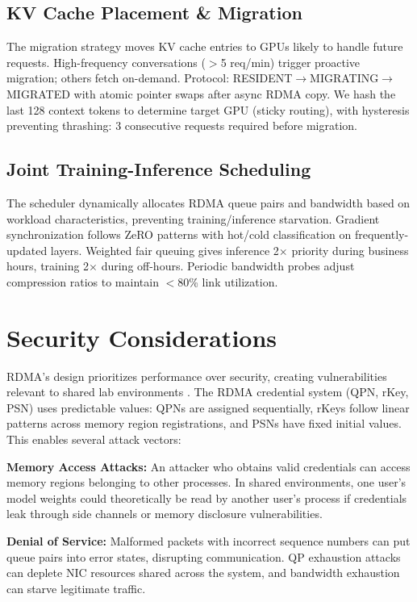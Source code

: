 \documentclass[10pt,letterpaper]{article}
\begin{document}
\subsection{KV Cache Placement \& Migration}
The migration strategy moves KV cache entries to GPUs likely to handle future requests. High-frequency conversations ($>$5 req/min) trigger proactive migration; others fetch on-demand. Protocol: RESIDENT$\rightarrow$MIGRATING$\rightarrow$MIGRATED with atomic pointer swaps after async RDMA copy. We hash the last 128 context tokens to determine target GPU (sticky routing), with hysteresis preventing thrashing: 3 consecutive requests required before migration.

\subsection{Joint Training-Inference Scheduling}
The scheduler dynamically allocates RDMA queue pairs and bandwidth based on workload characteristics, preventing training/inference starvation. Gradient synchronization follows ZeRO patterns with hot/cold classification on frequently-updated layers. Weighted fair queuing gives inference 2$\times$ priority during business hours, training 2$\times$ during off-hours. Periodic bandwidth probes adjust compression ratios to maintain $<$80\% link utilization.

\section{Security Considerations}

RDMA's design prioritizes performance over security, creating vulnerabilities relevant to shared lab environments \cite{bedrock, redmark}. The RDMA credential system (QPN, rKey, PSN) uses predictable values: QPNs are assigned sequentially, rKeys follow linear patterns across memory region registrations, and PSNs have fixed initial values. This enables several attack vectors:

\textbf{Memory Access Attacks:} An attacker who obtains valid credentials can access memory regions belonging to other processes. In shared environments, one user's model weights could theoretically be read by another user's process if credentials leak through side channels or memory disclosure vulnerabilities.

\textbf{Denial of Service:} Malformed packets with incorrect sequence numbers can put queue pairs into error states, disrupting communication. QP exhaustion attacks can deplete NIC resources shared across the system, and bandwidth exhaustion can starve legitimate traffic.
\end{document}
